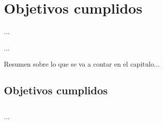 
%
%

\chapter{Objetivos cumplidos}

\begin{FraseCelebre}
\begin{Frase}
...
\end{Frase}
\begin{Fuente}
...
\end{Fuente}
\end{FraseCelebre}

\begin{resumen}
Resumen sobre lo que se va a contar en el capitulo...
\end{resumen}


\section{Objetivos cumplidos}
\label{cap33:sec:cumplidos}



\section*{\ProximoCapitulo}
\TocProximoCapitulo

...







